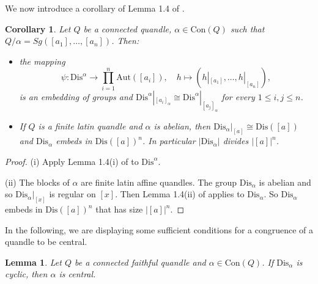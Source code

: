 \documentclass[a4paper, english, 9pt]{amsart}
\theoremstyle{plain}
\newtheorem{corollary}[theorem]{Corollary}
\newtheorem{lemma}[theorem]{Lemma}
\theoremstyle{definition}
\def\aut#1{\mathrm{Aut}(#1)}
\def\lmlt{\mathrm{LMlt}}
\def\dis{\mathrm{Dis}}
\def\con{\mathrm{Con}}
\begin{document}

We now introduce a corollary of Lemma 1.4 of \cite{LSS}.
\begin{corollary}
    \label{embedding as quandle}
	Let $Q$ be a connected quandle, $\alpha\in \con(Q)$ such that $Q/\alpha=Sg([a_1],\ldots, [a_n])$. Then:
	\begin{itemize}
		\item[(i)] the mapping
		\begin{displaymath}\psi: \dis^\alpha\longrightarrow \prod_{i =1}^n \aut{[a_i]},\quad h\mapsto (h|_{[a_1]},\ldots, h|_{[a_n]}),
		\end{displaymath}
		is an embedding of groups and $\dis^\alpha|_{[a_i]_\alpha}\cong \dis^\alpha|_{[a_j]_\alpha}$ for every $1\leq i,j\leq n$.
		
		\item[(ii)] If $Q$ is a finite latin quandle and $\alpha$ is abelian, then $\dis_\alpha|_{[a]}\cong \dis([a])$ and $\dis_\alpha$ embeds in $\dis([a])^n$. In particular $|\dis_\alpha|$ divides $|[a]|^n$. 
	\end{itemize}

\end{corollary}

 \begin{proof}
	(i) Apply Lemma 1.4(i) of \cite{LSS} to $\dis^\alpha$.
	
	(ii) The blocks of $\alpha$ are finite latin affine quandles. The group $\dis_\alpha$ is abelian and so $\dis_\alpha|_{[x]}$ is regular on $[x]$. Then Lemma 1.4(ii) of \cite{LSS} applies to $\dis_\alpha$. So $\dis_\alpha$ embeds in $\dis([a])^n$ that has size $|[a]|^n$.  
\end{proof}

In the following, we are displaying some sufficient conditions for a congruence of a quandle to be central. 
\begin{lemma}\label{central 2}
    Let $Q$ be a connected faithful quandle and $\alpha\in \con(Q)$. If $\dis_\alpha$ is cyclic, then $\alpha$ is central.
\end{lemma}
\end{document}
